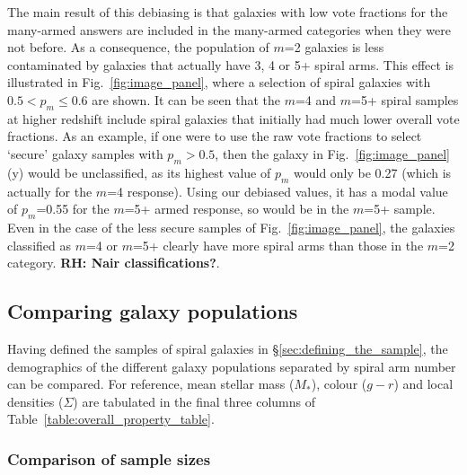 \documentclass[useAMS,usenatbib]{mn2e}
\newcommand{\rh}[1]{{\bf \textcolor{RoyalPurple}{RH: #1}}}
\begin{document}
The main result of this debiasing is that galaxies with low vote fractions for the many-armed answers are included in the many-armed categories when they were not before. As a consequence, the population of $m$=2 galaxies is less contaminated by galaxies that actually have 3, 4 or 5+ spiral arms. This effect is illustrated in Fig.~\ref{fig:image_panel}, where a selection of spiral galaxies with $0.5 < p_m \leq 0.6$ are shown. It can be seen that the $m$=4 and $m$=5+ spiral samples at higher redshift include spiral galaxies that initially had much lower overall vote fractions. As an example, if one were to use the raw vote fractions to select `secure' galaxy samples with $p_m>0.5$, then the galaxy in Fig.~\ref{fig:image_panel}(y) would be unclassified, as its highest value of $p_m$ would only be 0.27 (which is actually for the $m$=4 response). Using our debiased values, it has a modal value of $p_m$=0.55 for the $m$=5+ armed response, so would be in the $m$=5+ sample. Even in the case of the less secure samples of Fig.~\ref{fig:image_panel}, the galaxies classified as $m$=4 or $m$=5+ clearly have more spiral arms than those in the $m$=2 category. \rh{Nair classifications?}.

\subsection{Comparing galaxy populations}
\label{sec:comparison}

Having defined the samples of spiral galaxies in \S\ref{sec:defining_the_sample}, the demographics of the different galaxy populations separated by spiral arm number can be compared. For reference, mean stellar mass ($M_*$), colour ($g-r$) and local densities ($\Sigma$) are tabulated in the final three columns of Table~\ref{table:overall_property_table}.


\subsubsection{Comparison of sample sizes}
\label{sample_fractions}
\end{document}
